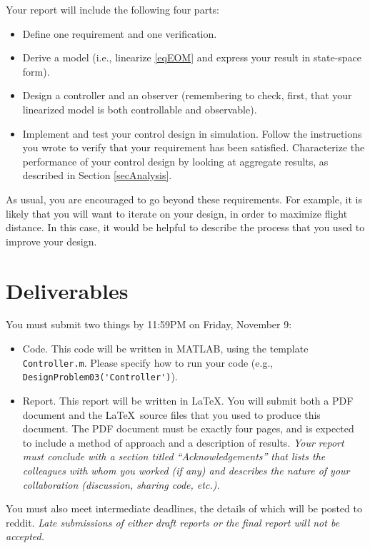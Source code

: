 \documentclass[12pt]{article}
\begin{document}
Your report will include the following four parts:
\begin{itemize}

\item Define one requirement and one verification.

\item Derive a model (i.e., linearize \eqref{eqEOM} and express your result in state-space form).

\item Design a controller and an observer (remembering to check, first, that your linearized model is both controllable and observable).

\item Implement and test your control design in simulation. Follow the instructions you wrote to verify that your requirement has been satisfied. Characterize the performance of your control design by looking at aggregate results, as described in Section \ref{secAnalysis}.

\end{itemize}
As usual, you are encouraged to go beyond these requirements. For example, it is likely that you will want to iterate on your design, in order to maximize flight distance. In this case, it would be helpful to describe the process that you used to improve your design.


\section{Deliverables}

You must submit two things by 11:59PM on Friday, November 9:
\begin{itemize}

\item Code. This code will be written in MATLAB, using the template \lstinline!Controller.m!. Please specify how to run your code (e.g., \lstinline!DesignProblem03('Controller')!).

\item Report. This report will be written in \LaTeX. You will submit both a PDF document and the \LaTeX\ source files that you used to produce this document. The PDF document must be exactly four pages, and is expected to include a method of approach and a description of results. {\em Your report must conclude with a section titled ``Acknowledgements'' that lists the colleagues with whom you worked (if any) and describes the nature of your collaboration (discussion, sharing code, etc.).}

\end{itemize}
You must also meet intermediate deadlines, the details of which will be posted to reddit. {\em Late submissions of either draft reports or the final report will not be accepted.}
\end{document}
